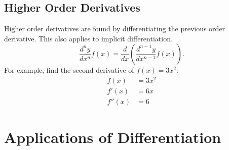 \documentclass[12pt]{article}
\begin{document}
\subsection{Higher Order Derivatives}
Higher order derivatives are found by differentiating the previous order derivative. This also applies to implicit differentiation.
\[ \frac{d^n y}{dx^n} f(x) = \frac{d}{dx} \left( \frac{d^{n-1} y}{dx^{n-1}} f(x) \right). \]
For example, find the second derivative of $f(x) = 3x^2$:
\begin{align*}
	f(x) &= 3x^2 \\
	f'(x) &= 6x \\
	f''(x) &= 6
\end{align*}

\section{Applications of Differentiation}
\end{document}
